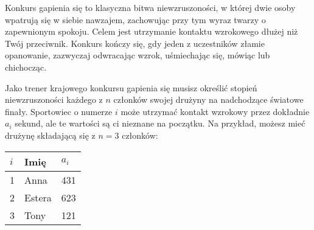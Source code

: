 

\noindent
Konkurs gapienia się to klasyczna bitwa niewzruszoności, w której dwie osoby wpatrują się w siebie nawzajem, zachowując przy tym wyraz twarzy o zapewnionym spokoju.
Celem jest utrzymanie kontaktu wzrokowego dłużej niż Twój przeciwnik.
Konkurs kończy się, gdy jeden z uczestników złamie opanowanie, zazwyczaj odwracając wzrok, uśmiechając się, mówiąc lub chichocząc.

Jako trener krajowego konkursu gapienia się musisz określić stopień niewzruszoności każdego z $n$ członków swojej drużyny na nadchodzące światowe finały.
Sportowiec o numerze $i$ może utrzymać kontakt wzrokowy przez dokładnie $a_i$ sekund, ale te wartości są ci nieznane na początku.
Na przykład, możesz mieć drużynę składającą się z $n=3$ członków:

\medskip
\begin{tabular}{lll}
  $i$ & Imię & $a_i$\\\hline
 1 & Anna & 431 \\ %
 2 & Estera & 623 \\
 3 & Tony & 121\\
\end{tabular}

